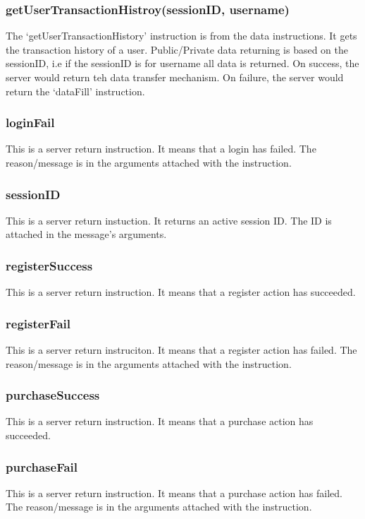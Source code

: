 \documentclass[a4paper]{article}
\begin{document}
\subsubsection{getUserTransactionHistroy(sessionID, username)}
The `getUserTransactionHistory' instruction is from the data instructions. It
gets the transaction history of a user. Public/Private data returning is based
on the sessionID, i.e if the sessionID is for username all data is returned. On
success, the server would return teh data transfer mechanism. On failure, the
server would return the `dataFill' instruction.

\subsubsection{loginFail}
This is a server return instruction. It means that a login has failed. The
reason/message is in the arguments attached with the instruction.

\subsubsection{sessionID}
This is a server return instuction. It returns an active session ID. The ID is
attached in the message's arguments.

\subsubsection{registerSuccess}
This is a server return instruction. It means that a register action has
succeeded.

\subsubsection{registerFail}
This is a server return instruciton. It means that a register action has
failed. The reason/message is in the arguments attached with the instruction.

\subsubsection{purchaseSuccess}
This is a server return instruction. It means that a purchase action has
succeeded.

\subsubsection{purchaseFail}
This is a server return instruction. It means that a purchase action has
failed. The reason/message is in the arguments attached with the instruction.
\end{document}

